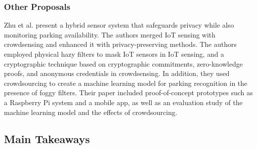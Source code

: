 \subsubsection{Other Proposals}

Zhu et al. \cite{ZhuIntegrating} present a hybrid sensor system that safeguards
privacy while also monitoring parking availability. The authors merged IoT
sensing with crowdsensing and enhanced it with privacy-preserving methods.
The authors employed physical hazy filters to mask IoT sensors in IoT sensing,
and a cryptographic technique based on cryptographic commitments, zero-knowledge
proofs, and anonymous credentials in crowdsensing. In addition, they used
crowdsourcing to create a machine learning model for parking recognition
in the presence of foggy filters. Their paper included proof-of-concept
prototypes such as a Raspberry Pi system and a mobile app, as well as an
evaluation study of the machine learning model and the effects of crowdsourcing.

\subsection{Main Takeaways}

